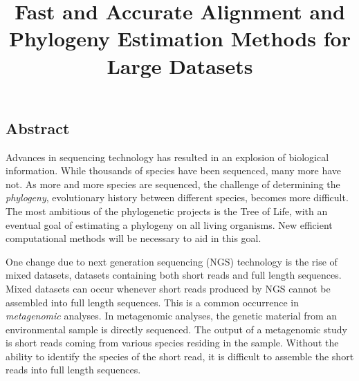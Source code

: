 \documentclass[times, 10pt]{article}
\begin{document}
\title{Fast and Accurate Alignment and Phylogeny Estimation Methods for Large Datasets}

\maketitle
\thispagestyle{empty}
\pagestyle{plain}
\begin{center}
\section*{Abstract}
\end{center}
Advances in sequencing technology has resulted in an explosion of biological information.  While thousands of species have been sequenced, many more have not.  As more and more species are sequenced, the challenge of determining the \emph{phylogeny}, evolutionary history between different species, becomes more difficult.  The most ambitious of the phylogenetic projects is the Tree of Life, with an eventual goal of estimating a phylogeny on all living organisms.  New efficient computational methods will be necessary to aid in this goal.



One change due to next generation sequencing (NGS) technology is the rise of mixed datasets, datasets containing both short reads and full length sequences.  Mixed datasets can occur whenever short reads produced by NGS cannot be assembled into full length sequences.  This is a common occurrence in \emph{metagenomic} analyses.  In metagenomic analyses, the genetic material from an environmental sample is directly sequenced.  The output of a metagenomic study is short reads coming from various species residing in the sample.  Without the ability to identify the species of the short read, it is difficult to assemble the short reads into full length sequences.
\end{document}
